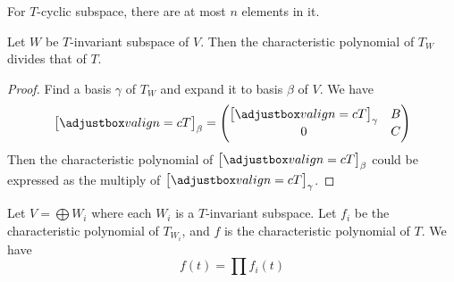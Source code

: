 For $T$-cyclic subspace, there are at most $n$ elements in it. 

\begin{theorem}\label{split_of_invariant_subspace}
    Let $W$ be $T$-invariant subspace of $V$. Then the characteristic polynomial of $T_W$ divides that of $T$.    
\end{theorem}
\begin{proof}
    Find a basis $\gamma$ of $T_W$ and expand it to basis $\beta$ of $V$. We have 
    \begin{equation*}
        \coordinate{T}_\beta = \begin{pmatrix}
            \coordinate{T}_\gamma & B \\
            0 & C        
        \end{pmatrix}
    \end{equation*}
    Then the characteristic polynomial of $\coordinate{T}_\beta$ could be expressed as the multiply of $\coordinate{T}_\gamma$.
\end{proof}

\begin{theorem}
    Let $V = \bigoplus W_i$ where each $W_i$ is a $T$-invariant subspace. Let $f_i$ be the characteristic polynomial of $T_{W_i}$, and $f$ is the characteristic polynomial of $T$. We have 
    \begin{equation}
        f(t) = \prod f_i (t)
    \end{equation}
\end{theorem}




